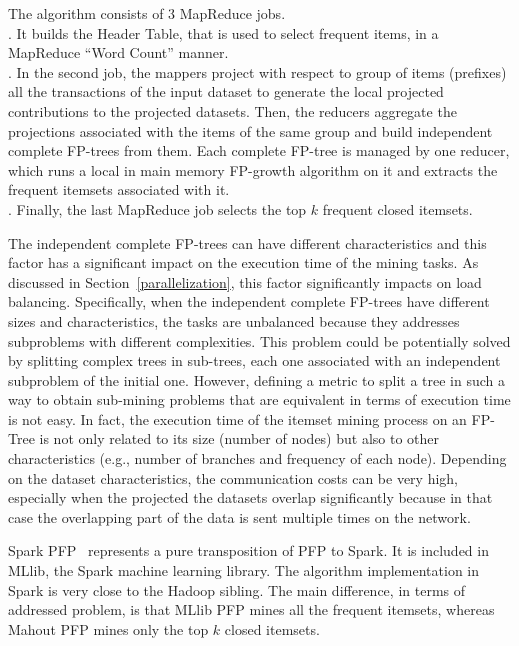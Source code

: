 The algorithm consists of 3 MapReduce jobs.\\ 
. It builds the Header Table, that is used to select frequent items, in a MapReduce ``Word Count'' manner. \\
. In the second job, the mappers project with respect to group of items (prefixes) all the transactions of the input dataset to generate the local projected contributions to the projected datasets. Then, the reducers aggregate the projections associated with the items of the same group and build independent complete FP-trees from them. Each complete FP-tree is managed by one reducer, which runs a local in main memory FP-growth algorithm on it and extracts the frequent itemsets associated with it.  \\
. Finally, the last MapReduce job selects the top $k$ frequent closed itemsets.

The independent complete FP-trees can have different characteristics and this factor has
a significant impact on the execution time of the mining tasks. As discussed in Section~\ref{parallelization},
this factor significantly impacts on load balancing. Specifically,   
when the independent complete FP-trees have different sizes and characteristics, the tasks are unbalanced because they addresses
subproblems with different complexities. This problem could be potentially solved by
splitting complex trees in sub-trees, each one associated with an independent subproblem of the initial one.
However, defining a metric to split a tree
in such a way to obtain sub-mining problems that are equivalent in terms of execution time is not easy. In fact, the execution 
time of the itemset mining process on an FP-Tree is not only related to its size (number of nodes) but also to other characteristics (e.g., number of branches
and frequency of each node). 
Depending on the dataset characteristics, the communication costs can be very high, especially when the projected the datasets overlap significantly
because in that case the overlapping part of the data is sent multiple times on the network.

Spark PFP~\cite{MLLib} represents a pure transposition of PFP to Spark. It
is included in MLlib, the Spark machine learning library. The algorithm
implementation in Spark is very close to the Hadoop sibling. The main difference, in terms of addressed problem, is that 
MLlib PFP mines all the frequent itemsets, whereas Mahout PFP mines only the top $k$ closed itemsets. 

